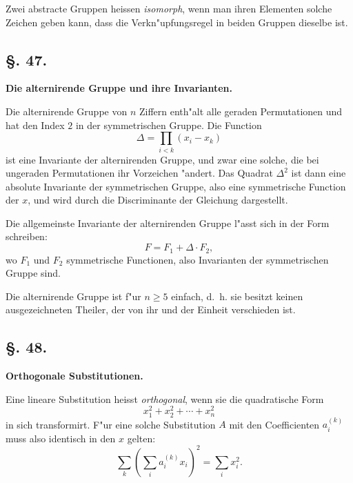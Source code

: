 \documentclass[12pt,a4paper]{article}
\theoremstyle{weber}
\begin{document}
Zwei abstracte Gruppen heissen \textit{isomorph}, wenn man ihren Elementen solche Zeichen geben kann, dass die Verkn"upfungsregel in beiden Gruppen dieselbe ist.


\newpage
\subsection*{\S. 47.}

\begin{center}
\textbf{Die alternirende Gruppe und ihre Invarianten.}
\end{center}

\bigskip

Die alternirende Gruppe von $n$ Ziffern enth"alt alle geraden Permutationen und hat den Index $2$ in der symmetrischen Gruppe. Die Function
\begin{equation}\label{eq:1}
\Delta = \prod_{i<k} (x_i - x_k)
\end{equation}
ist eine Invariante der alternirenden Gruppe, und zwar eine solche, die bei ungeraden Permutationen ihr Vorzeichen "andert. Das Quadrat $\Delta^2$ ist dann eine absolute Invariante der symmetrischen Gruppe, also eine symmetrische Function der $x$, und wird durch die Discriminante der Gleichung dargestellt.

Die allgemeinste Invariante der alternirenden Gruppe l"asst sich in der Form schreiben:
\begin{equation}\label{eq:2}
F = F_1 + \Delta \cdot F_2,
\end{equation}
wo $F_1$ und $F_2$ symmetrische Functionen, also Invarianten der symmetrischen Gruppe sind.

Die alternirende Gruppe ist f"ur $n \geq 5$ einfach, d.~h. sie besitzt keinen ausgezeichneten Theiler, der von ihr und der Einheit verschieden ist.

\newpage
\subsection*{\S. 48.}

\begin{center}
\textbf{Orthogonale Substitutionen.}
\end{center}

\bigskip

Eine lineare Substitution heisst \textit{orthogonal}, wenn sie die quadratische Form
\begin{equation}\label{eq:1}
x_1^2 + x_2^2 + \cdots + x_n^2
\end{equation}
in sich transformirt. F"ur eine solche Substitution $A$ mit den Coefficienten $a_i^{(k)}$ muss also identisch in den $x$ gelten:
\begin{equation}\label{eq:2}
\sum_k \left(\sum_i a_i^{(k)} x_i\right)^2 = \sum_i x_i^2.
\end{equation}
\end{document}
